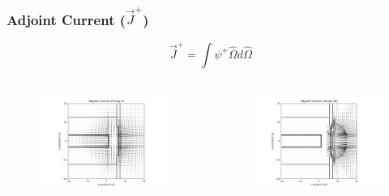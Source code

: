 \documentclass[t]{beamer}
\begin{document}
\begin{frame}
  \frametitle{Adjoint Current ($\vec{J}^+$)}
  \vskip-0.25in
  \begin{equation}
    \vec{J}^+ = \int\psi^+\hat{\Omega}d\hat{\Omega}
  \end{equation}
  \vskip-0.25in
  \begin{columns}
    \begin{figure}
      \includegraphics[trim={0.7in 0.15in 1.05in 0.4in},clip,scale=0.36]{images/current_adj_g02.png}
    \end{figure}
    \begin{figure}
      \includegraphics[trim={0.7in 0.15in 1.05in 0.4in},clip,scale=0.36]{images/current_adj_g26.png}

\end{figure}
\end{columns}
\end{frame}
\end{document}
